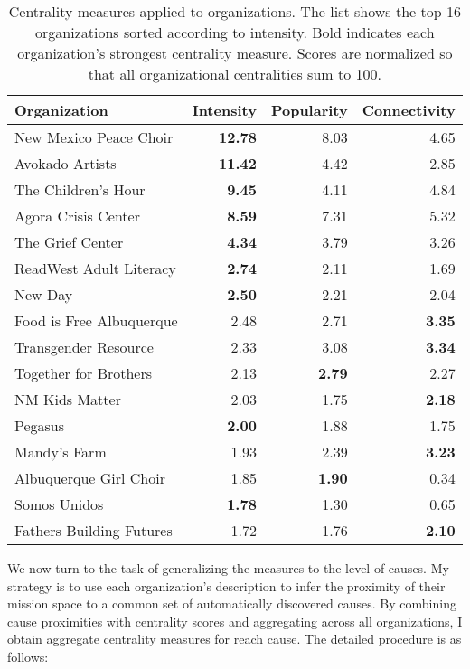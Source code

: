 \begin{table}[H]
  \caption{Centrality measures applied to organizations. The list shows the top 16 organizations sorted according to intensity. Bold indicates each organization's strongest centrality measure. Scores are normalized so that all organizational centralities sum to 100.}
  \label{tab:org}
  \begin{tabular*}{\linewidth}{l@{\extracolsep{\fill}}rrr}
    \toprule
    Organization & Intensity & Popularity & Connectivity \\
    \midrule
    New Mexico Peace Choir & \textbf{12.78} & 8.03 & 4.65 \\
    Avokado Artists & \textbf{11.42} & 4.42 & 2.85 \\
    The Children's Hour & \textbf{9.45} & 4.11 & 4.84 \\
    Agora Crisis Center & \textbf{8.59} & 7.31 & 5.32 \\
    The Grief Center & \textbf{4.34} & 3.79 & 3.26 \\
    ReadWest Adult Literacy & \textbf{2.74} & 2.11 & 1.69 \\
    New Day & \textbf{2.50} & 2.21 & 2.04 \\
    Food is Free Albuquerque & 2.48 & 2.71 & \textbf{3.35} \\
    Transgender Resource & 2.33 & 3.08 & \textbf{3.34} \\
    Together for Brothers & 2.13 & \textbf{2.79} & 2.27 \\
    NM Kids Matter & 2.03 & 1.75 & \textbf{2.18} \\
    Pegasus & \textbf{2.00} & 1.88 & 1.75 \\
    Mandy's Farm & 1.93 & 2.39 & \textbf{3.23} \\
    Albuquerque Girl Choir & 1.85 & \textbf{1.90} & 0.34 \\
    Somos Unidos & \textbf{1.78} & 1.30 & 0.65 \\
    Fathers Building Futures & 1.72 & 1.76 & \textbf{2.10} \\
    \bottomrule
  \end{tabular*}
\end{table}

We now turn to the task of generalizing the measures to the level of causes.
My strategy is to use each organization's description to infer the proximity of their mission space to a common set of automatically discovered causes.
By combining cause proximities with centrality scores and aggregating across all organizations, I obtain aggregate centrality measures for reach cause.
The detailed procedure is as follows:

